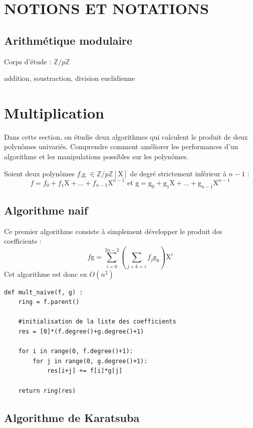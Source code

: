 \documentclass[a4paper]{article}
\begin{document}
\section{NOTIONS ET NOTATIONS}


\subsection{Arithmétique modulaire}

Corps d'étude : ${\mathbb{Z}/p \mathbb{Z}}$


addition, soustraction, division euclidienne

\section{Multiplication}

Dans cette section, on étudie deux algorithmes qui calculent le produit de deux polynômes univariés.
Comprendre comment améliorer les performances d'un algorithme et les manipulations possibles sur les polynômes.


Soient deux polynômes $f$,g $\in \mathbb{Z}/p\mathbb{Z}[\mathrm{X}]$ de degré strictement inférieur à $n-1$ :
\[
f=f_0+f_1\mathrm{X}+...+f_{n-1}\mathrm{X}^{n-1}\text{ et g}=\mathrm{g}_0+\mathrm{g}_1\mathrm{X}+...+\mathrm{g}_{n-1}\mathrm{X}^{n-1}
\]

\subsection{Algorithme naif}

Ce premier algorithme consiste à simplement développer le produit des coefficients :
\[
f\text{g}=\sum_{i=0}^{2n-2} (\sum_{j+k=i}f_j\mathrm{g}_k) \mathrm{X}^i
\]
Cet algorithme est donc en $O(n^2)$

\begin{lstlisting}[title={multiplication naive}]
    def mult_naive(f, g) :
    ring = f.parent()

    #initialisation de la liste des coefficients
    res = [0]*(f.degree()+g.degree()+1) 
    
    for i in range(0, f.degree()+1):
        for j in range(0, g.degree()+1):
            res[i+j] += f[i]*g[j]

    return ring(res) 
\end{lstlisting}


\subsection{Algorithme de Karatsuba}
\end{document}
